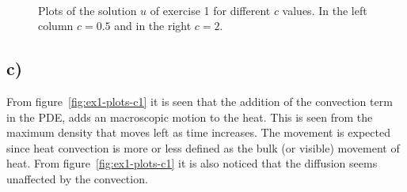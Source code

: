 \begin{figure}[!ht]
{            }
    \mbox{ \quad 
            }
    \caption{Plots of the solution $u$ of exercise 1 for different $c$ values. In the left column $c=0.5$ and in the right $c=2$.}
    \label{fig:ex1-plots-c2}
    \end{figure}

    \subsection*{c)}
    
    From figure~\ref{fig:ex1-plots-c1} it is seen that the addition of the convection term in the PDE, adds an macroscopic motion to the heat. This is seen from the maximum density that moves left as time increases. The movement is expected since heat convection is more or less defined as the bulk (or visible) movement of heat. From figure~\ref{fig:ex1-plots-c1} it is also noticed that the diffusion seems unaffected by the convection.

